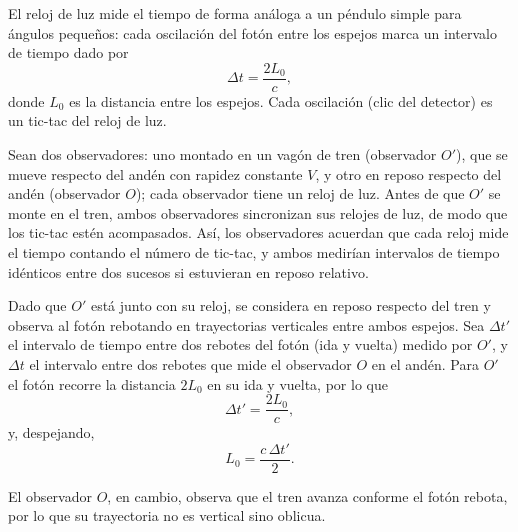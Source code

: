 \begin{center}
\end{center}

El reloj de luz mide el tiempo de forma análoga a un péndulo simple para
ángulos pequeños: cada oscilación del fotón entre los espejos marca un
intervalo de tiempo dado por
\[
\Delta t = \frac{2L_0}{c}, \tag{13}
\]
donde $L_0$ es la distancia entre los espejos. Cada oscilación (clic del
detector) es un tic-tac del reloj de luz.

Sean dos observadores: uno montado en un vagón de tren (observador
$O'$), que se mueve respecto del andén con rapidez constante $V$, y otro
en reposo respecto del andén (observador $O$); cada observador tiene un
reloj de luz. Antes de que $O'$ se monte en el tren, ambos observadores
sincronizan sus relojes de luz, de modo que los tic-tac estén
acompasados. Así, los observadores acuerdan que cada reloj mide el
tiempo contando el número de tic-tac, y ambos medirían intervalos de
tiempo idénticos entre dos sucesos si estuvieran en reposo relativo.

Dado que $O'$ está junto con su reloj, se considera en reposo respecto
del tren y observa al fotón rebotando en trayectorias verticales entre
ambos espejos. Sea $\Delta t'$ el intervalo de tiempo entre dos rebotes
del fotón (ida y vuelta) medido por $O'$, y $\Delta t$ el intervalo
entre dos rebotes que mide el observador $O$ en el andén. Para $O'$ el
fotón recorre la distancia $2L_0$ en su ida y vuelta, por lo que
\[
\Delta t' = \frac{2L_0}{c}, \tag{14}
\]
y, despejando,
\[
L_0 = \frac{c\,\Delta t'}{2} . \tag{15}
\]

El observador $O$, en cambio, observa que el tren avanza conforme el
fotón rebota, por lo que su trayectoria no es vertical sino oblicua.

